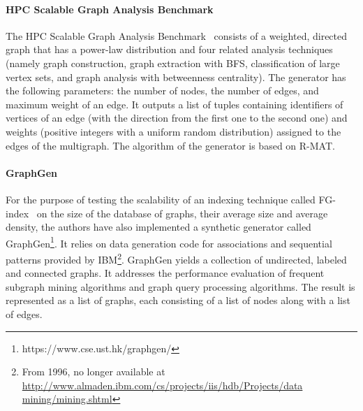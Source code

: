 \paragraph{HPC Scalable Graph Analysis Benchmark} The HPC Scalable Graph
Analysis Benchmark~\cite{HPCgraph,Bader:2005:DIH:2099301.2099360} consists of a
weighted, directed graph that has a power-law distribution and four related
analysis techniques (namely graph construction, graph extraction with BFS,
                     classification of large vertex sets, and graph analysis
                     with betweenness centrality). The generator has the
following parameters: the number of nodes, the number of edges, and maximum weight of
an edge. It outputs a list of tuples containing identifiers of vertices of an
edge (with the direction from the first one to the second one) and weights
(positive integers  with a uniform random distribution) assigned to the edges of
the multigraph.  The algorithm of the generator is based on R-MAT.



\paragraph{GraphGen} For the purpose of testing the scalability of an indexing
technique called FG-index~\cite{Cheng:2007:FTV:1247480.1247574} on the size of the
database of graphs, their average size and average density, the authors have
also implemented a synthetic generator called
GraphGen\footnote{https://www.cse.ust.hk/graphgen/}. It relies on data generation code for associations and sequential
patterns provided by IBM\footnote{From 1996, no longer available at
\url{http://www.almaden.ibm.com/cs/projects/iis/hdb/Projects/data
mining/mining.shtml}}. GraphGen yields a collection of undirected, labeled and
connected graphs. It addresses the performance evaluation of frequent subgraph mining
algorithms and graph query processing algorithms. The result is represented as a
list of graphs, each consisting of a list of nodes along with a list of edges.


